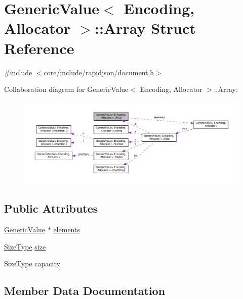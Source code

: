 \hypertarget{structGenericValue_1_1Array}{}\section{Generic\+Value$<$ Encoding, Allocator $>$\+:\+:Array Struct Reference}
\label{structGenericValue_1_1Array}


{\ttfamily \#include $<$core/include/rapidjson/document.\+h$>$}



Collaboration diagram for Generic\+Value$<$ Encoding, Allocator $>$\+:\+:Array\+:
\nopagebreak
\begin{figure}[H]
\begin{center}
\leavevmode
\includegraphics[width=350pt]{structGenericValue_1_1Array__coll__graph}
\end{center}
\end{figure}
\subsection*{Public Attributes}
\begin{DoxyCompactItemize}
\item 
\hyperlink{classGenericValue}{Generic\+Value} $\ast$ \hyperlink{structGenericValue_1_1Array_a0af8e50f37486f042ab19fd871d11d4f}{elements}
\item 
\hyperlink{rapidjson_8h_a5ed6e6e67250fadbd041127e6386dcb5}{Size\+Type} \hyperlink{structGenericValue_1_1Array_a60f69b3b57b86c20c123c1b080e34bcc}{size}
\item 
\hyperlink{rapidjson_8h_a5ed6e6e67250fadbd041127e6386dcb5}{Size\+Type} \hyperlink{structGenericValue_1_1Array_a2f5dfb089ee750e9405d5adeda4df894}{capacity}
\end{DoxyCompactItemize}


\subsection{Member Data Documentation}
